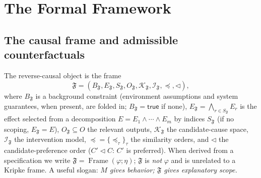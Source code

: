 \documentclass[11pt]{article}
\theoremstyle{remark}
\newcommand{\True}{\mathsf{true}}
\newcommand{\Frame}{\mathfrak{F}}
\newcommand{\Design}{\eta}
\begin{document}
\section{The Formal Framework}
\label{sec:formal}

\subsection{The causal frame and admissible counterfactuals}

The reverse-causal object is the frame
\[
  \Frame=(B_{\Frame},E_{\Frame},S_{\Frame},O_{\Frame},
          \mathcal{K}_{\Frame},\mathcal{I}_{\Frame},{\preceq},\triangleleft),
\]
where \(B_{\Frame}\) is a background constraint (environment assumptions and
system guarantees, when present, are folded in; \(B_{\Frame}=\True\) if none),
\(E_{\Frame}=\bigwedge_{r\in S_{\Frame}}E_r\) is the effect selected from a
decomposition \(E=E_1\land\cdots\land E_m\) by indices \(S_{\Frame}\) (if no
scoping, \(E_{\Frame}=E\)), \(O_{\Frame}\subseteq O\) the relevant outputs,
\(\mathcal{K}_{\Frame}\) the candidate-cause space, \(\mathcal{I}_{\Frame}\) the
intervention model, \({\preceq}=\{\preceq_\tau\}_\tau\) the similarity orders, and
\(\triangleleft\) the candidate-preference order (\(C'\triangleleft C\): \(C'\) is
preferred). When derived from a specification we write
\(\Frame=\operatorname{Frame}(\varphi;\Design)\); \(\Frame\) is \emph{not}
\(\varphi\) and is unrelated to a Kripke frame. A useful slogan: \emph{\(M\) gives
behavior; \(\Frame\) gives explanatory scope.}
\end{document}
